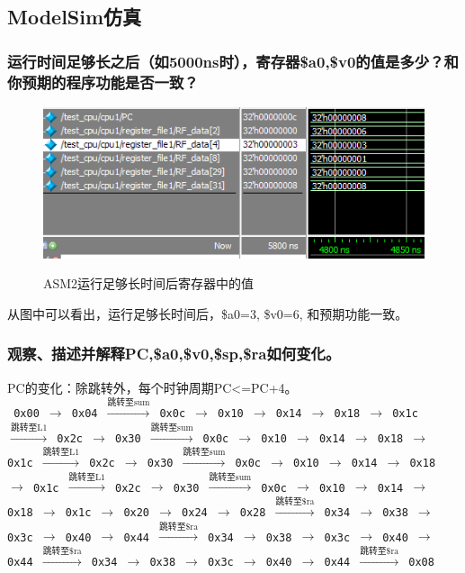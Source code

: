 \documentclass{article}
\begin{document}
        \subsection{ModelSim仿真}
            \subsubsection*{运行时间足够长之后（如5000ns时），寄存器\$a0,\$v0的值是多少？和你预期的程序功能是否一致？}
            \begin{figure}[htb]
                \centering
                \includegraphics{fig2.png} \\
                \caption{\label{fig:reg-value-2}ASM2运行足够长时间后寄存器中的值}
            \end{figure}
            从图中可以看出，运行足够长时间后，\$a0=3, \$v0=6, 和预期功能一致。
            \subsubsection*{观察、描述并解释PC,\$a0,\$v0,\$sp,\$ra如何变化。}
            PC的变化：除跳转外，每个时钟周期PC<=PC+4。 \\
            \texttt{
            0x00 $\rightarrow$ 0x04 $\xrightarrow{\text{跳转至sum}}$ 0x0c $\rightarrow$ 0x10  $\rightarrow$ 0x14 $\rightarrow$ 0x18 $\rightarrow$ 0x1c $\xrightarrow{\text{跳转至L1}}$ 0x2c $\rightarrow$ 0x30 $\xrightarrow{\text{跳转至sum}}$ 0x0c $\rightarrow$ 0x10 $\rightarrow$ 0x14 $\rightarrow$ 0x18 $\rightarrow$ 0x1c $\xrightarrow{\text{跳转至L1}}$ 0x2c $\rightarrow$ 0x30 $\xrightarrow{\text{跳转至sum}}$ 0x0c $\rightarrow$ 0x10  $\rightarrow$ 0x14 $\rightarrow$ 0x18 $\rightarrow$ 0x1c $\xrightarrow{\text{跳转至L1}}$ 0x2c $\rightarrow$ 0x30 $\xrightarrow{\text{跳转至sum}}$ 0x0c $\rightarrow$ 0x10 $\rightarrow$ 0x14 $\rightarrow$ 0x18 $\rightarrow$ 0x1c $\rightarrow$ 0x20 $\rightarrow$ 0x24 $\rightarrow$ 0x28 $\xrightarrow{\text{跳转至\$ra}}$ 0x34 $\rightarrow$ 0x38 $\rightarrow$ 0x3c $\rightarrow$ 0x40 $\rightarrow$ 0x44 $\xrightarrow{\text{跳转至\$ra}}$ 0x34 $\rightarrow$ 0x38 $\rightarrow$ 0x3c $\rightarrow$ 0x40 $\rightarrow$ 0x44 $\xrightarrow{\text{跳转至\$ra}}$ 0x34 $\rightarrow$ 0x38 $\rightarrow$ 0x3c $\rightarrow$ 0x40 $\rightarrow$ 0x44 $\xrightarrow{\text{跳转至\$ra}}$ 0x08
            ~\\}
\end{document}
